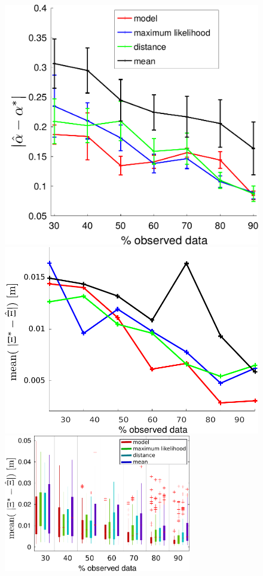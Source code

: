 \documentclass[utf8]{frontiersSCNS} %
\begin{document}
\begin{figure}[h]
 \begin{minipage}[c]{.46\linewidth}
\includegraphics[width=\hsize]{img/alphaErrorAll.pdf}
\end{minipage} \hfill
   \begin{minipage}[c]{.46\linewidth}
\includegraphics[width=\hsize]{img/YErrorAll.pdf}
\end{minipage}
\center
\includegraphics[height=6cm]{img/errorBoxplot.pdf}

\end{figure}
\end{document}
